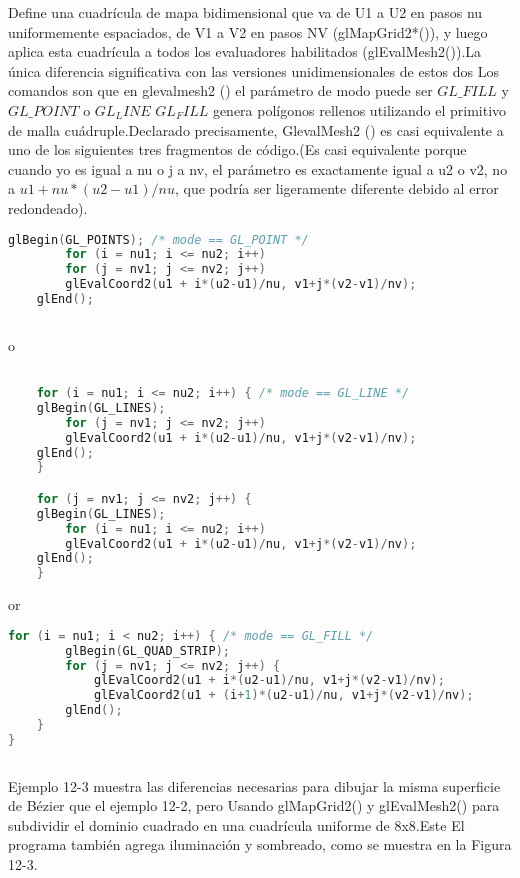 \documentclass[]{article}
\begin{document}
Define una cuadrícula de mapa bidimensional que va de U1 a U2 en pasos nu uniformemente espaciados, de V1 a
V2 en pasos NV (glMapGrid2*()), y luego aplica esta cuadrícula a todos los evaluadores habilitados
(glEvalMesh2()).La única diferencia significativa con las versiones unidimensionales de estos dos
Los comandos son que en glevalmesh2 () el parámetro de modo puede ser $GL\_FILL$ y $GL\_POINT$
o $GL_LINE$ $GL_FILL$ genera polígonos rellenos utilizando el primitivo de malla cuádruple.Declarado precisamente,
GlevalMesh2 () es casi equivalente a uno de los siguientes tres fragmentos de código.(Es casi
equivalente porque cuando yo es igual a nu o j a nv, el parámetro es exactamente igual a u2 o v2, no
a $u1+nu*(u2-u1)/nu$, que podría ser ligeramente diferente debido al error redondeado).


\begin{lstlisting}[language=C++]
    glBegin(GL_POINTS); /* mode == GL_POINT */
        for (i = nu1; i <= nu2; i++)
        for (j = nv1; j <= nv2; j++)
        glEvalCoord2(u1 + i*(u2-u1)/nu, v1+j*(v2-v1)/nv);
    glEnd();
    
\end{lstlisting}

o


\begin{lstlisting}[language=C++]

    for (i = nu1; i <= nu2; i++) { /* mode == GL_LINE */
    glBegin(GL_LINES);
        for (j = nv1; j <= nv2; j++)
        glEvalCoord2(u1 + i*(u2-u1)/nu, v1+j*(v2-v1)/nv);
    glEnd();
    }

    for (j = nv1; j <= nv2; j++) {
    glBegin(GL_LINES);
        for (i = nu1; i <= nu2; i++)
        glEvalCoord2(u1 + i*(u2-u1)/nu, v1+j*(v2-v1)/nv);
    glEnd();
    }

\end{lstlisting}

or

\begin{lstlisting}[language=C++]
    for (i = nu1; i < nu2; i++) { /* mode == GL_FILL */
        glBegin(GL_QUAD_STRIP);
        for (j = nv1; j <= nv2; j++) {
            glEvalCoord2(u1 + i*(u2-u1)/nu, v1+j*(v2-v1)/nv);
            glEvalCoord2(u1 + (i+1)*(u2-u1)/nu, v1+j*(v2-v1)/nv);
        glEnd();
    }
}
    
\end{lstlisting}

Ejemplo 12-3 muestra las diferencias necesarias para dibujar la misma superficie de Bézier que el ejemplo 12-2, pero
Usando glMapGrid2() y glEvalMesh2() para subdividir el dominio cuadrado en una cuadrícula uniforme de 8x8.Este
El programa también agrega iluminación y sombreado, como se muestra en la Figura 12-3.
\end{document}

